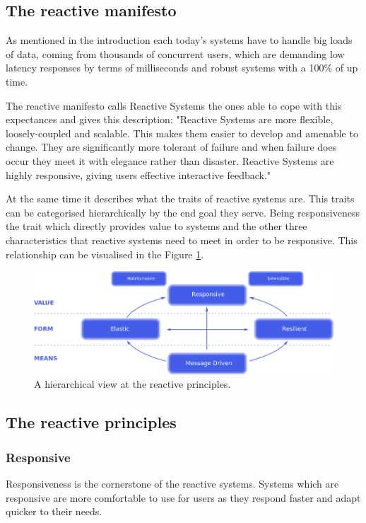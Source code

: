 \documentclass[../main.tex]{subfiles}
\begin{document}
\subsection{The reactive manifesto}
As mentioned in the introduction each today's systems have to handle big loads of data, coming from thousands of concurrent users, which are demanding low latency responses by terms of milliseconds and robust systems with a 100\% of up time.

The reactive manifesto \autocite{2014TheManifesto} calls Reactive Systems the ones able to cope with this expectances and gives this description: "Reactive Systems are more flexible, loosely-coupled and scalable. This makes them easier to develop and amenable to change. They are significantly more tolerant of failure and when failure does occur they meet it with elegance rather than disaster. Reactive Systems are highly responsive, giving users effective interactive feedback."


At the same time it describes what the traits of reactive systems are. This traits can be categorised hierarchically by the end goal they serve. Being responsiveness the trait which directly provides value to systems and the other three characteristics that reactive systems need to meet in order to be responsive. This relationship can be visualised in the Figure \ref{fig:reactive}.

\begin{figure}[ht]
    \centering
        \includegraphics[width=1\textwidth]{images/reactive-traits.png}
    \caption{A hierarchical view at the reactive principles.}
    \label{fig:reactive}
\end{figure}

\subsection{The reactive principles}
\subsubsection{Responsive}
Responsiveness is the cornerstone of the reactive systems. Systems which are responsive are more comfortable to use for users as they respond faster and adapt quicker to their needs.
\end{document}
